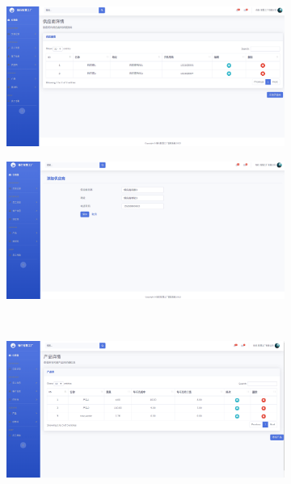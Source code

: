 \begin{figure}[H]
    \centering
    \begin{subfigure}{.35\textwidth}
        \centering
        \includegraphics[width=\textwidth]{figures/6viewallsupplier.png}
        \label{fig:vuaspie}
    \end{subfigure}
    \qquad
    \begin{subfigure}{.35\textwidth}
        \centering
        \includegraphics[width=\textwidth]{figures/6addnewsupplier.png}
        \label{fig:adspie}
    \end{subfigure}
    \\
    \begin{subfigure}{.35\textwidth}
        \centering
        \includegraphics[width=\textwidth]{figures/6viewallproduct.png}

\end{subfigure}
\end{figure}
